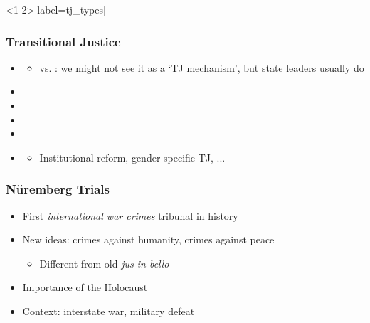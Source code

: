 \documentclass[aspectratio=43]{beamer}
\begin{document}

\begin{frame}<1-2>[label=tj_types]
\frametitle{Transitional Justice}
\centering

\begin{itemize}
  \item {}
  \begin{itemize}
    \item<3-> vs. : we might not see it as a `TJ mechanism', but state leaders usually do
  \end{itemize}
  \item<4-> 
  \item<5-> 
  \item<6-> 
  \item<7-> 
  \item<8-> 
  \begin{itemize}
    \item Institutional reform, gender-specific TJ, ...
  \end{itemize}
\end{itemize}

\end{frame}


\begin{frame}
\frametitle{Nüremberg Trials}
\centering

\begin{itemize}
  \item First \textit{international war crimes} tribunal in history
  \item<2-> New ideas: crimes against humanity, crimes against peace
  \begin{itemize}
    \item Different from old \textit{jus in bello}
  \end{itemize}
  \item<3-> Importance of the Holocaust
  \item<4-> Context: interstate war, military defeat
\end{itemize}

\end{frame}
\end{document}
